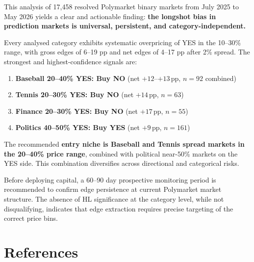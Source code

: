 \documentclass[11pt,a4paper]{article}
\begin{document}
This analysis of 17,458 resolved Polymarket binary markets from July 2025 to
May 2026 yields a clear and actionable finding: \textbf{the longshot bias in
prediction markets is universal, persistent, and category-independent.}

Every analysed category exhibits systematic overpricing of YES in the 10--30\%
range, with gross edges of 6--19 pp and net edges of 4--17 pp after 2\% spread.
The strongest and highest-confidence signals are:

\begin{enumerate}[leftmargin=*]
  \item \textbf{Baseball 20--40\% YES: Buy NO} (net $+12$--$+13\,\mathrm{pp}$, $n=92$ combined)
  \item \textbf{Tennis 20--30\% YES: Buy NO} (net $+14\,\mathrm{pp}$, $n=63$)
  \item \textbf{Finance 20--30\% YES: Buy NO} (net $+17\,\mathrm{pp}$, $n=55$)
  \item \textbf{Politics 40--50\% YES: Buy YES} (net $+9\,\mathrm{pp}$, $n=161$)
\end{enumerate}

The recommended \textbf{entry niche is Baseball and Tennis spread markets in the
20--40\% price range}, combined with political near-50\% markets on the YES side.
This combination diversifies across directional and categorical risks.

Before deploying capital, a 60--90 day prospective monitoring period is
recommended to confirm edge persistence at current Polymarket market structure.
The absence of HL significance at the category level, while not disqualifying,
indicates that edge extraction requires precise targeting of the correct price bins.

\section*{References}
\end{document}
